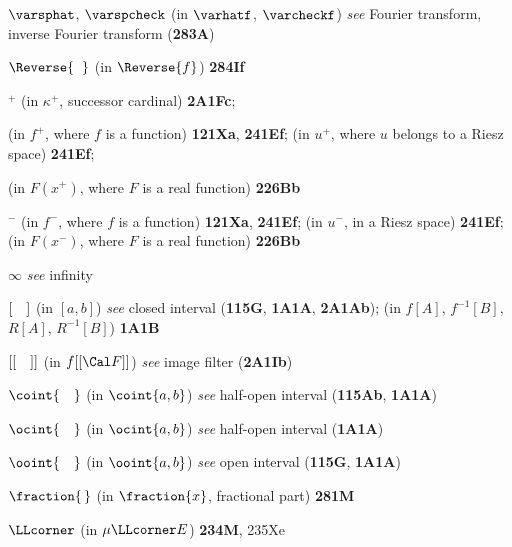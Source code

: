 $\varsphat$, $\varspcheck$ (in $\varhatf$, $\varcheckf$) {\it see}
Fourier transform, inverse Fourier transform ({\bf 283A})
















$\Reverse{\phantom{x}}$ (in $\Reverse{f}$) {\bf 284If}








$^+$
  (in $\kappa^+$, successor cardinal) {\bf 2A1Fc}; 
  
  (in $f^+$, where $f$ is a function) {\bf 121Xa}, {\bf 241Ef}; 
  (in $u^+$, where $u$ belongs to a Riesz space) {\bf 241Ef}; 
  
  (in $F(x^+)$, where $F$ is a real function) {\bf 226Bb}


$^-$ (in $f^-$, where $f$ is a function) {\bf 121Xa}, {\bf 241Ef};
  (in $u^-$, in a Riesz space) {\bf 241Ef};
  (in $F(x^-)$, where $F$ is a real function) {\bf 226Bb}
  






















$\infty$ {\it see} infinity





$[\hskip1em]$ (in $[a,b]$) {\it see} closed interval ({\bf 115G},
{\bf 1A1A}, {\bf 2A1Ab});
  (in $f[A]$, $f^{-1}[B]$, $R[A]$, $R^{-1}[B]$) {\bf 1A1B}

$[[\hskip1em]]$ (in $f[[\Cal F]]$) {\it see} image filter
({\bf 2A1Ib})




$\coint{\hskip1em}$ (in $\coint{a,b}$) {\it see} half-open interval
({\bf 115Ab}, {\bf 1A1A})

$\ocint{\hskip1em}$ (in $\ocint{a,b}$) {\it see} half-open interval
({\bf 1A1A})

$\ooint{\hskip1em}$ (in $\ooint{a,b}$) {\it see} open interval
({\bf 115G}, {\bf 1A1A})





$\fraction{\,}$ (in $\fraction{x}$, fractional part) {\bf 281M}




$\LLcorner$ (in $\mu\LLcorner E$) {\bf 234M}, 235Xe








\frnewpage


